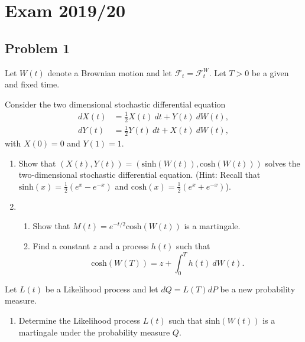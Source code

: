 \documentclass[a4paper,12pt,openany]{book}
\providecommand{\tightlist}{%
 \setlength{\itemsep}{0pt}\setlength{\parskip}{0pt}}
\begin{document}
\hypertarget{exam-201920}{%
\section{Exam 2019/20}\label{exam-201920}}

\hypertarget{problem-1-2}{%
\subsection{Problem 1}\label{problem-1-2}}

Let \(W(t)\) denote a Brownian motion and let \(\mathcal{F}_t=\mathcal{F}_t^W\). Let \(T>0\) be a given and fixed time.

Consider the two dimensional stochastic differential equation
\begin{align*}
dX(t)&=\frac{1}{2}X(t)\ dt+Y(t)\ dW(t),\\
dY(t)&=\frac{1}{2}Y(t)\ dt+X(t)\ dW(t),
\end{align*}
with \(X(0)=0\) and \(Y(1)=1\).

\begin{enumerate}
\def\labelenumi{\alph{enumi}.}
\item
  Show that \((X(t),Y(t))=(\text{sinh}(W(t)),\text{cosh}(W(t)))\) solves the two-dimensional stochastic differential equation. (Hint: Recall that \(\text{sinh}(x)=\frac{1}{2}(e^x-e^{-x})\) and \(\text{cosh}(x)=\frac{1}{2}(e^x+e^{-x})\)).
\item
  \begin{enumerate}
  \def\labelenumii{\roman{enumii}.}
  \tightlist
  \item
    Show that \(M(t)=e^{-t/2}\text{cosh}(W(t))\) is a martingale.
  \item
    Find a constant \(z\) and a process \(h(t)\) such that
    \[
    \text{cosh}(W(T))=z+\int_0^Th(t)\ dW(t).
    \]
  \end{enumerate}
\end{enumerate}

Let \(L(t)\) be a Likelihood process and let \(dQ=L(T)dP\) be a new probability measure.

\begin{enumerate}
\def\labelenumi{\alph{enumi}.}
\setcounter{enumi}{2}
\tightlist
\item
  Determine the Likelihood process \(L(t)\) such that \(\text{sinh}(W(t))\) is a martingale under the probability measure \(Q\).
\end{enumerate}

\noindent\makebox[\linewidth]{\rule{\textwidth}{0.4pt}}
\end{document}
